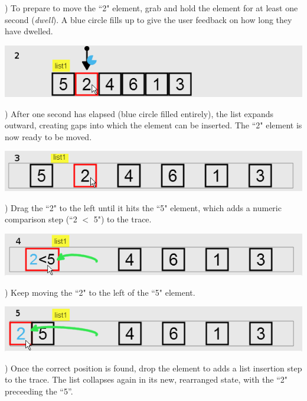 ) To prepare to move the ``2" element, grab and hold the element for
at least one second (\emph{dwell}). A blue circle fills up to give the user
feedback on how long they have dwelled.

\vspace{-0.25em}
\noindent \includegraphics[width=0.7\columnwidth]{img/examples/insertion-2.png}
\vspace{0.4em}

) After one second has elapsed (blue circle filled entirely), the
list expands outward, creating gaps into which the element can be inserted. The
``2" element is now ready to be moved.

\vspace{-0.25em}
\noindent \includegraphics[width=0.7\columnwidth]{img/examples/insertion-3.png}
\vspace{0.5em}

) Drag the ``2" to the left until it hits the ``5" element, which
adds a numeric comparison step (``2 $<$ 5") to the trace.

\vspace{-0.25em}
\noindent \includegraphics[width=0.7\columnwidth]{img/examples/insertion-4.png}
\vspace{0.5em}

) Keep moving the ``2" to the left of the ``5" element.

\vspace{-0.25em}
\noindent \includegraphics[width=0.7\columnwidth]{img/examples/insertion-5.png}
\vspace{0.5em}

) Once the correct position is found, drop the element
to adds a list insertion step to the trace. The list collapses again in its new, rearranged state, with the
``2" preceeding the ``5''.


